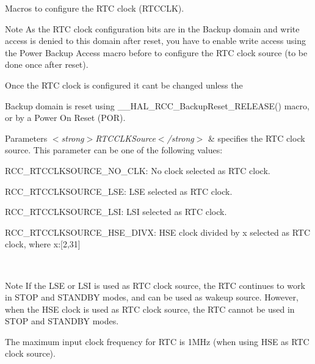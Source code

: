 Macros to configure the R\+TC clock (R\+T\+C\+C\+LK). 

\begin{DoxyNote}{Note}
As the R\+TC clock configuration bits are in the Backup domain and write access is denied to this domain after reset, you have to enable write access using the Power Backup Access macro before to configure the R\+TC clock source (to be done once after reset).

Once the R\+TC clock is configured it can\textquotesingle{}t be changed unless the
\end{DoxyNote}
Backup domain is reset using \+\_\+\+\_\+\+H\+A\+L\+\_\+\+R\+C\+C\+\_\+\+Backup\+Reset\+\_\+\+R\+E\+L\+E\+A\+S\+E() macro, or by a Power On Reset (P\+OR). 
\begin{DoxyParams}{Parameters}
{\em $<$strong$>$\+R\+T\+C\+C\+L\+K\+Source$<$/strong$>$} & specifies the R\+TC clock source. This parameter can be one of the following values\+: \begin{DoxyItemize}
\item R\+C\+C\+\_\+\+R\+T\+C\+C\+L\+K\+S\+O\+U\+R\+C\+E\+\_\+\+N\+O\+\_\+\+C\+L\+K\+: No clock selected as R\+TC clock. \item R\+C\+C\+\_\+\+R\+T\+C\+C\+L\+K\+S\+O\+U\+R\+C\+E\+\_\+\+L\+S\+E\+: L\+SE selected as R\+TC clock. \item R\+C\+C\+\_\+\+R\+T\+C\+C\+L\+K\+S\+O\+U\+R\+C\+E\+\_\+\+L\+S\+I\+: L\+SI selected as R\+TC clock. \item R\+C\+C\+\_\+\+R\+T\+C\+C\+L\+K\+S\+O\+U\+R\+C\+E\+\_\+\+H\+S\+E\+\_\+\+D\+I\+V\+X\+: H\+SE clock divided by x selected as R\+TC clock, where x\+:\mbox{[}2,31\mbox{]} \end{DoxyItemize}
\\
\hline
\end{DoxyParams}
\begin{DoxyNote}{Note}
If the L\+SE or L\+SI is used as R\+TC clock source, the R\+TC continues to work in S\+T\+OP and S\+T\+A\+N\+D\+BY modes, and can be used as wakeup source. However, when the H\+SE clock is used as R\+TC clock source, the R\+TC cannot be used in S\+T\+OP and S\+T\+A\+N\+D\+BY modes.

The maximum input clock frequency for R\+TC is 1M\+Hz (when using H\+SE as R\+TC clock source). 
\end{DoxyNote}
\mbox{\label{group___r_c_c___internal___r_t_c___clock___configuration_ga2b1e5349631886f29040d7a31c002718}} 
